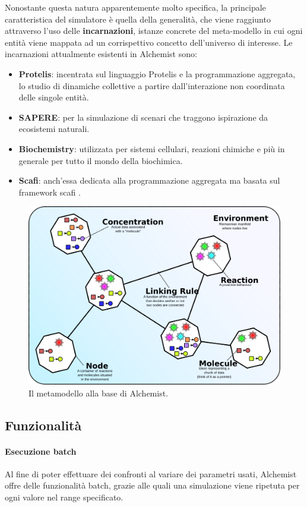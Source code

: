 Nonostante questa natura apparentemente molto specifica, la principale caratteristica del simulatore è quella della generalità, che viene raggiunto attraverso l'uso delle \textbf{incarnazioni}, istanze concrete del meta-modello in cui ogni entità viene mappata ad un corrispettivo concetto dell'universo di interesse.
Le incarnazioni attualmente esistenti in Alchemist sono:
\begin{itemize}
 \item \textbf{Protelis}: incentrata sul linguaggio Protelis \cite{Pianini2015} e la programmazione aggregata, lo studio di dinamiche collettive a partire dall'interazione non coordinata delle singole entità.
 \item \textbf{SAPERE}: per la simulazione di scenari che traggono ispirazione da ecosistemi naturali.
 \item \textbf{Biochemistry}: utilizzata per sistemi cellulari, reazioni chimiche e più in generale per tutto il mondo della biochimica.
 \item \textbf{Scafi}: anch'essa dedicata alla programmazione aggregata ma basata sul framework scafi \cite{Casadei2016}.
\end{itemize}

\begin{figure}
  \centering
  \includegraphics[width=0.80\linewidth]{immagini/alchemist-model.png}
  \caption{Il metamodello alla base di Alchemist.}
  \label{fig:alchemist-model}
\end{figure}

\subsection{Funzionalità}

\paragraph{Esecuzione batch} Al fine di poter effettuare dei confronti al variare dei parametri usati, Alchemist offre delle funzionalità batch, grazie alle quali una simulazione viene ripetuta per ogni valore nel range specificato.

